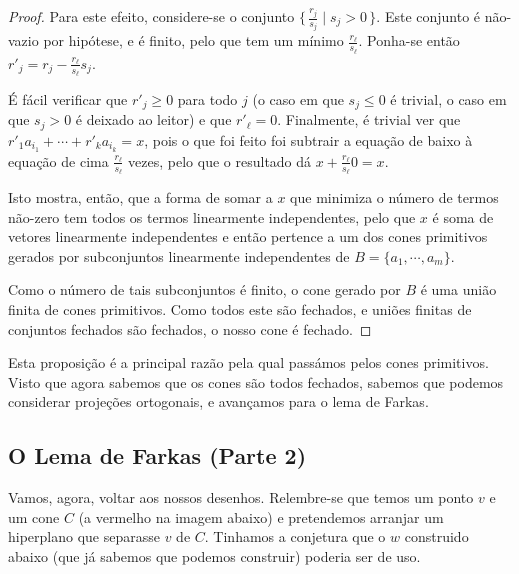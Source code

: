 \documentclass{article}
\theoremstyle{definition}
\begin{document}
\begin{proof}
	Para este efeito, considere-se o conjunto $\{\,\frac{r_j}{s_j} \mid s_j > 0\,\}$. Este conjunto é não-vazio por hipótese, e é finito, pelo que tem um mínimo $\frac{r_\ell}{s_\ell}$. Ponha-se então $r'_j = r_j - \frac{r_\ell}{s_\ell} s_j$.
	
	É fácil verificar que $r'_j \geq 0$ para todo $j$ (o caso em que $s_j \leq 0$ é trivial, o caso em que $s_j > 0$ é deixado ao leitor) e que $r'_\ell = 0$. Finalmente, é trivial ver que $r'_1 a_{i_1} + \cdots + r'_k a_{i_k} = x$, pois o que foi feito foi subtrair a equação de baixo à equação de cima $\frac{r_\ell}{s_\ell}$ vezes, pelo que o resultado dá $x + \frac{r_\ell}{s_\ell} 0 = x$.
	
	Isto mostra, então, que a forma de somar a $x$ que minimiza o número de termos não-zero tem todos os termos linearmente independentes, pelo que $x$ é soma de vetores linearmente independentes e então pertence a um dos cones primitivos gerados por subconjuntos linearmente independentes de $B = \{a_1, \cdots, a_m\}$.
	
	Como o número de tais subconjuntos é finito, o cone gerado por $B$ é uma união finita de cones primitivos. Como todos este são fechados, e uniões finitas de conjuntos fechados são fechados, o nosso cone é fechado.
	\end{proof}
	
	Esta proposição é a principal razão pela qual passámos pelos cones primitivos. Visto que agora sabemos que os cones são todos fechados, sabemos que podemos considerar projeções ortogonais, e avançamos para o lema de Farkas.
	
	\subsection{O Lema de Farkas (Parte 2)}
	
	Vamos, agora, voltar aos nossos desenhos. Relembre-se que temos um ponto $v$ e um cone $C$ (a vermelho na imagem abaixo) e pretendemos arranjar um hiperplano que separasse $v$ de $C$. Tinhamos a conjetura que o $w$ construido abaixo (que já sabemos que podemos construir) poderia ser de uso.
	
	
\end{document}
